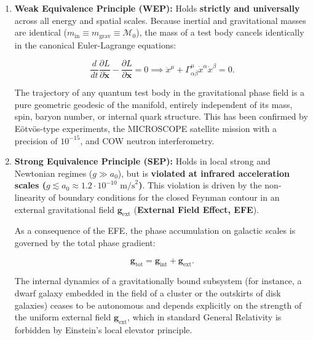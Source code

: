 \documentclass[11pt,a4paper]{article}
\theoremstyle{definition}
\begin{document}
\begin{enumerate}
\item \textbf{Weak Equivalence Principle (WEP):}
Holds \textbf{strictly and universally} across all energy and spatial scales. Because inertial and gravitational masses are identical ($m_{\text{in}} \equiv m_{\text{grav}} \equiv \mathcal{M}_0$), the mass of a test body cancels identically in the canonical Euler-Lagrange equations:

\begin{equation}\label{eq:2.55a}\tag{2.55a}
\frac{d}{dt}\frac{\partial L}{\partial \dot{\mathbf{x}}} - \frac{\partial L}{\partial \mathbf{x}} = 0 \implies \ddot{x}^\mu + \Gamma^\mu_{\alpha\beta} \dot{x}^\alpha \dot{x}^\beta = 0.
\end{equation}

The trajectory of any quantum test body in the gravitational phase field is a pure geometric geodesic of the manifold, entirely independent of its mass, spin, baryon number, or internal quark structure. This has been confirmed by E\"otv\"os-type experiments, the MICROSCOPE satellite mission with a precision of $10^{-15}$, and COW neutron interferometry.

\item \textbf{Strong Equivalence Principle (SEP):}
Holds in local strong and Newtonian regimes ($g \gg a_0$), but is \textbf{violated at infrared acceleration scales ($g \lesssim a_0 \approx 1.2 \cdot 10^{-10}\text{ m/s}^2$)}. 
This violation is driven by the non-linearity of boundary conditions for the closed Feynman contour in an external gravitational field $\mathbf{g}_{\text{ext}}$ (\textbf{External Field Effect, EFE}). 

As a consequence of the EFE, the phase accumulation on galactic scales is governed by the total phase gradient:

\begin{equation}\label{eq:2.55b}\tag{2.55b}
\mathbf{g}_{\text{tot}} = \mathbf{g}_{\text{int}} + \mathbf{g}_{\text{ext}}.
\end{equation}

The internal dynamics of a gravitationally bound subsystem (for instance, a dwarf galaxy embedded in the field of a cluster or the outskirts of disk galaxies) ceases to be autonomous and depends explicitly on the strength of the uniform external field $\mathbf{g}_{\text{ext}}$, which in standard General Relativity is forbidden by Einstein's local elevator principle.
\end{enumerate}
\end{document}

